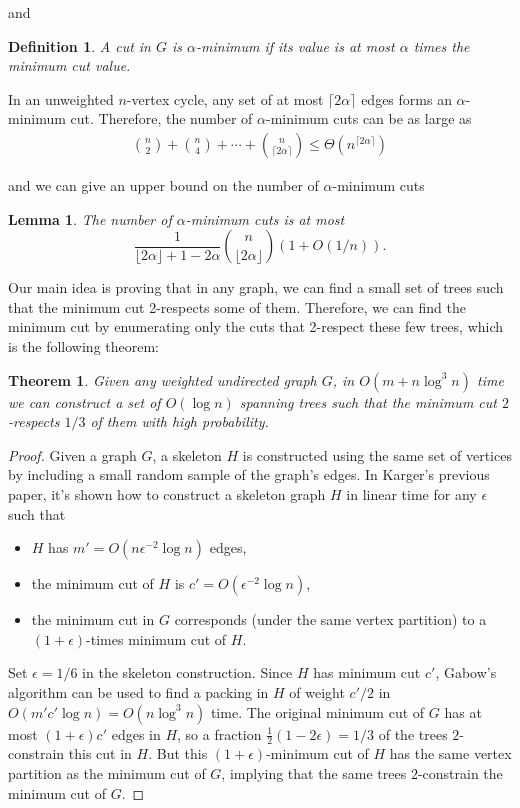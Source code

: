 \documentclass[11pt]{article}
\theoremstyle{plain}
\newtheorem{lemma}{Lemma}[section]
\newtheorem{theorem}{Theorem}[section]
\newtheorem{definition}{Definition}[section]
\begin{document}
and 

\begin{definition}
    A cut in $G$ is $\alpha$-minimum if its value is at most
    $\alpha$ times the minimum cut value.
\end{definition}

In an unweighted $n$-vertex cycle, any set of at most $\lceil 2\alpha\rceil$ edges forms an $\alpha$-minimum cut. Therefore, the number of $\alpha$-minimum cuts can be as large as
\begin{align*}
    \binom{n}{2}+\binom{n}{4}+\cdots+\binom{n}{\lceil 2\alpha\rceil}\leq \Theta(n^{\lceil 2\alpha\rceil})
\end{align*}

and we can give an upper bound on the number of $\alpha$-minimum cuts

\begin{lemma}
    The number of $\alpha$-minimum cuts is at most
  \[
  \frac{1}{\lfloor 2\alpha \rfloor + 1 -2\alpha} \binom{n}{\lfloor
      2\alpha \rfloor}(1+O(1/n)).
  \]
\end{lemma} 

Our main idea is proving that in any graph, we can find a small set of trees such that the minimum cut 2-respects some of them. Therefore, we can find the minimum cut by enumerating only the cuts that 2-respect these few trees, which is the following theorem:

\begin{theorem}
    \label{theorem:2respect}
    Given any weighted undirected graph $G$, in $O(m+n\log^3 n)$ time we can construct a set of $O(\log n)$ spanning trees such that the minimum cut $2$-respects $1/3$ of them with high probability.
\end{theorem}

\begin{proof}
    Given a graph $G$, a skeleton $H$ is constructed using the same set of vertices by including a small random sample of the graph's edges. In Karger's previous paper\cite{karger1994random}, it's shown how to construct a skeleton graph $H$ in linear time for any $\epsilon$ such that
    \begin{itemize}
    \item $H$ has $m' = O(n\epsilon^{-2}\log n)$ edges,
    \item the minimum cut of $H$ is $c' = O(\epsilon^{-2}\log n)$,
    \item the minimum cut in $G$ corresponds (under the same vertex
      partition) to a $(1+\epsilon)$-times minimum cut of $H$.
    \end{itemize}
    Set $\epsilon=1/6$ in the skeleton construction.  Since $H$ has
    minimum cut $c'$, Gabow's algorithm\cite{gabow1991faster} can be used to find a packing in $H$ of weight $c'/2$ in $O(m'c'\log n)=O(n\log^3 n)$ time.  The original minimum cut of $G$ has at most $(1 +\epsilon)c'$ edges in $H$, so a fraction $\frac12(1-2\epsilon)=1/3$ of the trees $2$-constrain this cut in $H$.  But this $(1+\epsilon)$-minimum cut of $H$ has the same vertex partition as the minimum cut of $G$, implying that the same trees $2$-constrain the minimum cut of $G$.
\end{proof}
\end{document}

